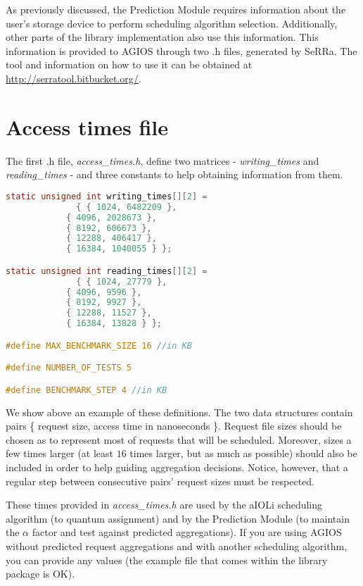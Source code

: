 As previously discussed, the Prediction Module requires information about the user's storage device to perform scheduling algorithm selection. Additionally, other parts of the library implementation also use this information. This information is provided to AGIOS through two .h files, generated by SeRRa. The tool and information on how to use it can be obtained at \url{http://serratool.bitbucket.org/}.

\section{Access times file}

The first .h file, \emph{access\_times.h}, define two matrices - \emph{writing\_times} and \emph{reading\_times} - and three constants to help obtaining information from them.

\begin{lstlisting}[language=C]
static unsigned int writing_times[][2] = 
		      { { 1024, 6482209 },
			{ 4096, 2028673 },
			{ 8192, 606673 },
			{ 12288, 406417 },
			{ 16384, 1040055 } };

static unsigned int reading_times[][2] = 
		      { { 1024, 27779 },
			{ 4096, 9596 },
			{ 8192, 9927 },
			{ 12288, 11527 },
			{ 16384, 13828 } };

#define MAX_BENCHMARK_SIZE 16 //in KB

#define NUMBER_OF_TESTS 5

#define BENCHMARK_STEP 4 //in KB
\end{lstlisting}

We show above an example of these definitions. The two data structures contain pairs \{ request size, access time in nanoseconds \}. Request file sizes should be chosen as to represent most of requests that will be scheduled. Moreover, sizes a few times larger (at least $16$ times larger, but as much as possible) should also be included in order to help guiding aggregation decisions. Notice, however, that a regular step between consecutive pairs' request sizes must be respected. 

These times provided in \emph{access\_times.h} are used by the aIOLi scheduling algorithm (to quantum assignment) and by the Prediction Module (to maintain the $\alpha$ factor and test against predicted aggregations). If you are using AGIOS without predicted request aggregations and with another scheduling algorithm, you can provide any values (the example file that comes within the library package is OK).

